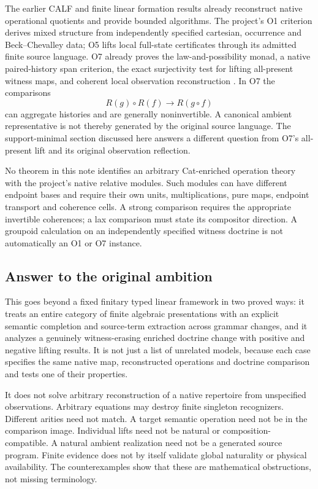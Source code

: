 \documentclass[11pt]{article}
\theoremstyle{definition}
\theoremstyle{remark}
\begin{document}
The earlier CALF and finite linear formation results already reconstruct
native operational quotients and provide bounded algorithms. The project's
O1 criterion derives mixed structure from independently specified cartesian,
occurrence and Beck--Chevalley data; O5 lifts local full-state certificates
through its admitted finite source language. O7 already proves the
law-and-possibility monad, a native paired-history span criterion, the exact
surjectivity test for lifting all-present witness maps, and coherent local
observation reconstruction \cite{CALF,Formation,O1,O5,O7}.
In O7 the comparisons
\[
                  R(g)\circ R(f)\longrightarrow R(g\circ f)
\]
can aggregate histories and are generally noninvertible. A canonical
ambient representative is not thereby generated by the original source
language. The support-minimal section discussed here answers a different
question from O7's all-present lift and its original observation reflection.

No theorem in this note identifies an arbitrary Cat-enriched operation
theory with the project's native relative modules. Such modules can have
different endpoint bases and require their own units, multiplications,
pure maps, endpoint transport and coherence cells. A strong comparison
requires the appropriate invertible coherences; a lax comparison must state
its compositor direction. A groupoid calculation on an independently
specified witness doctrine is not automatically an O1 or O7 instance.

\subsection{Answer to the original ambition}
This goes beyond a fixed finitary typed linear framework in two proved
ways: it treats an entire category of finite algebraic presentations with
an explicit semantic completion and source-term extraction across grammar
changes, and it analyzes a genuinely witness-erasing enriched doctrine
change with positive and negative lifting results. It is not just a list
of unrelated models, because each case specifies the same native map,
reconstructed operations and doctrine comparison and tests one of their
properties.

It does not solve arbitrary reconstruction of a native repertoire from
unspecified observations. Arbitrary equations may destroy finite
singleton recognizers. Different arities need not match. A target semantic
operation need not be in the comparison image. Individual lifts need not
be natural or composition-compatible. A natural ambient realization need
not be a generated source program. Finite evidence does not by itself
validate global naturality or physical availability. The counterexamples
show that these are mathematical obstructions, not missing terminology.
\end{document}
